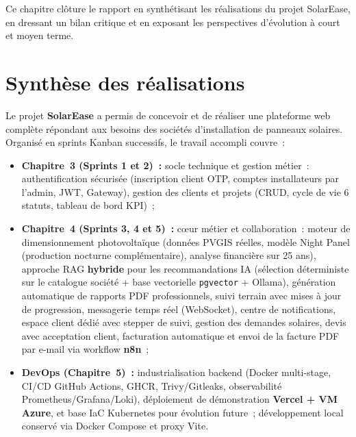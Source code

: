 
\begin{chapterintro}
  Ce chapitre clôture le rapport en synthétisant les réalisations du projet
  SolarEase, en dressant un bilan critique et en exposant les perspectives
  d'évolution à court et moyen terme.
\end{chapterintro}

\section*{Synthèse des réalisations}

Le projet \textbf{SolarEase} a permis de concevoir et de réaliser une
plateforme web complète répondant aux besoins des sociétés d'installation
de panneaux solaires. Organisé en sprints Kanban successifs, le travail
accompli couvre~:

\begin{itemize}
  \item \textbf{Chapitre~3 (Sprints 1 et 2)~:} socle technique et gestion
    métier~: authentification sécurisée (inscription client OTP, comptes
    installateurs par l'admin, JWT, Gateway), gestion des clients et
    projets (CRUD, cycle de vie 6 statuts, tableau de bord KPI)~;
  \item \textbf{Chapitre~4 (Sprints 3, 4 et 5)~:} cœur métier et
    collaboration~: moteur de dimensionnement photovoltaïque (données PVGIS
    réelles, modèle Night Panel (production nocturne complémentaire),
    analyse financière sur 25 ans), approche
    RAG \textbf{hybride} pour les recommandations IA (sélection
    déterministe sur le catalogue société + base vectorielle
    \texttt{pgvector} + Ollama), génération automatique de rapports PDF
    professionnels, suivi terrain avec mises à jour de progression,
    messagerie temps réel (WebSocket), centre de notifications, espace
    client dédié avec stepper de suivi, gestion des demandes solaires,
    devis avec acceptation client, facturation automatique et envoi de la
    facture PDF par e-mail via workflow \textbf{n8n}~;
  \item \textbf{DevOps (Chapitre~5)~:} industrialisation backend
    (Docker multi-stage, CI/CD GitHub Actions, GHCR, Trivy/Gitleaks,
    observabilité Prometheus/Grafana/Loki), déploiement de démonstration
    \textbf{Vercel + VM Azure}, et base IaC Kubernetes pour évolution
    future~; développement local conservé via Docker Compose et proxy Vite.
\end{itemize}

